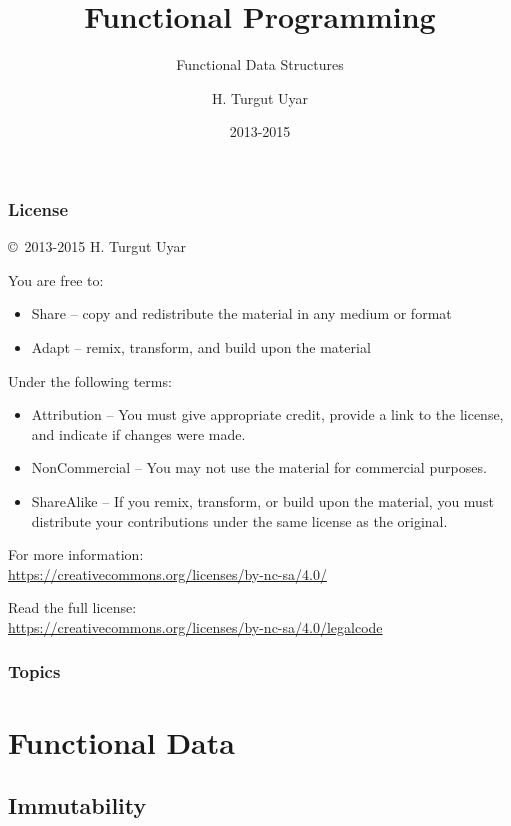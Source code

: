 \documentclass[dvipsnames]{beamer}
\title{Functional Programming}
\subtitle{Functional Data Structures}
\author{H. Turgut Uyar}
\date{2013-2015}
\theoremstyle{plain}
\begin{document}
\begin{frame}
  \titlepage
\end{frame}

\begin{frame}
  \frametitle{License}

  \hfill
  \copyright~2013-2015 H. Turgut Uyar

  \vfill
  \begin{footnotesize}
    You are free to:
    \begin{itemize}
      \itemsep0em
      \item Share -- copy and redistribute the material in any medium or format
      \item Adapt -- remix, transform, and build upon the material
    \end{itemize}

    Under the following terms:
    \begin{itemize}
      \itemsep0em
      \item Attribution -- You must give appropriate credit, provide a link to
        the license, and indicate if changes were made.

      \item NonCommercial -- You may not use the material for commercial
        purposes.

      \item ShareAlike -- If you remix, transform, or build upon the material,
        you must distribute your contributions under the same license as the
        original.
    \end{itemize}

    For more information:\\
    \url{https://creativecommons.org/licenses/by-nc-sa/4.0/}

    \smallskip
    Read the full license:\\
    \url{https://creativecommons.org/licenses/by-nc-sa/4.0/legalcode}
  \end{footnotesize}
\end{frame}

\begin{frame}
  \frametitle{Topics}
  \tableofcontents
\end{frame}

\section{Functional Data}

\subsection{Immutability}
\end{document}
